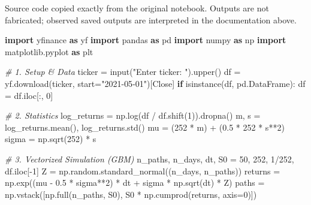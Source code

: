 \documentclass[
  11pt,
]{article}
\newenvironment{Shaded}{}{}
\newcommand{\BuiltInTok}[1]{\textcolor[rgb]{0.00,0.50,0.00}{#1}}
\newcommand{\CommentTok}[1]{\textcolor[rgb]{0.38,0.63,0.69}{\textit{#1}}}
\newcommand{\ControlFlowTok}[1]{\textcolor[rgb]{0.00,0.44,0.13}{\textbf{#1}}}
\newcommand{\DecValTok}[1]{\textcolor[rgb]{0.25,0.63,0.44}{#1}}
\newcommand{\FloatTok}[1]{\textcolor[rgb]{0.25,0.63,0.44}{#1}}
\newcommand{\ImportTok}[1]{\textcolor[rgb]{0.00,0.50,0.00}{\textbf{#1}}}
\newcommand{\NormalTok}[1]{#1}
\newcommand{\OperatorTok}[1]{\textcolor[rgb]{0.40,0.40,0.40}{#1}}
\newcommand{\StringTok}[1]{\textcolor[rgb]{0.25,0.44,0.63}{#1}}
\begin{document}
Source code copied exactly from the original notebook. Outputs are not fabricated; observed saved outputs are interpreted in the documentation above.

\begin{Shaded}
\begin{Highlighting}[]
\ImportTok{import}\NormalTok{ yfinance }\ImportTok{as}\NormalTok{ yf}
\ImportTok{import}\NormalTok{ pandas }\ImportTok{as}\NormalTok{ pd}
\ImportTok{import}\NormalTok{ numpy }\ImportTok{as}\NormalTok{ np}
\ImportTok{import}\NormalTok{ matplotlib.pyplot }\ImportTok{as}\NormalTok{ plt}

\CommentTok{\# 1. Setup \& Data}
\NormalTok{ticker }\OperatorTok{=} \BuiltInTok{input}\NormalTok{(}\StringTok{"Enter ticker: "}\NormalTok{).upper()}
\NormalTok{df }\OperatorTok{=}\NormalTok{ yf.download(ticker, start}\OperatorTok{=}\StringTok{"2021{-}05{-}01"}\NormalTok{)[}\StringTok{\textquotesingle{}Close\textquotesingle{}}\NormalTok{]}
\ControlFlowTok{if} \BuiltInTok{isinstance}\NormalTok{(df, pd.DataFrame): df }\OperatorTok{=}\NormalTok{ df.iloc[:, }\DecValTok{0}\NormalTok{]}

\CommentTok{\# 2. Statistics}
\NormalTok{log\_returns }\OperatorTok{=}\NormalTok{ np.log(df }\OperatorTok{/}\NormalTok{ df.shift(}\DecValTok{1}\NormalTok{)).dropna()}
\NormalTok{m, s }\OperatorTok{=}\NormalTok{ log\_returns.mean(), log\_returns.std()}
\NormalTok{mu }\OperatorTok{=}\NormalTok{ (}\DecValTok{252} \OperatorTok{*}\NormalTok{ m) }\OperatorTok{+}\NormalTok{ (}\FloatTok{0.5} \OperatorTok{*} \DecValTok{252} \OperatorTok{*}\NormalTok{ s}\OperatorTok{**}\DecValTok{2}\NormalTok{)}
\NormalTok{sigma }\OperatorTok{=}\NormalTok{ np.sqrt(}\DecValTok{252}\NormalTok{) }\OperatorTok{*}\NormalTok{ s}

\CommentTok{\# 3. Vectorized Simulation (GBM)}
\NormalTok{n\_paths, n\_days, dt, S0 }\OperatorTok{=} \DecValTok{50}\NormalTok{, }\DecValTok{252}\NormalTok{, }\DecValTok{1}\OperatorTok{/}\DecValTok{252}\NormalTok{, df.iloc[}\OperatorTok{{-}}\DecValTok{1}\NormalTok{]}
\NormalTok{Z }\OperatorTok{=}\NormalTok{ np.random.standard\_normal((n\_days, n\_paths))}
\NormalTok{returns }\OperatorTok{=}\NormalTok{ np.exp((mu }\OperatorTok{{-}} \FloatTok{0.5} \OperatorTok{*}\NormalTok{ sigma}\OperatorTok{**}\DecValTok{2}\NormalTok{) }\OperatorTok{*}\NormalTok{ dt }\OperatorTok{+}\NormalTok{ sigma }\OperatorTok{*}\NormalTok{ np.sqrt(dt) }\OperatorTok{*}\NormalTok{ Z)}
\NormalTok{paths }\OperatorTok{=}\NormalTok{ np.vstack([np.full(n\_paths, S0), S0 }\OperatorTok{*}\NormalTok{ np.cumprod(returns, axis}\OperatorTok{=}\DecValTok{0}\NormalTok{)])}


\end{Highlighting}
\end{Shaded}
\end{document}
